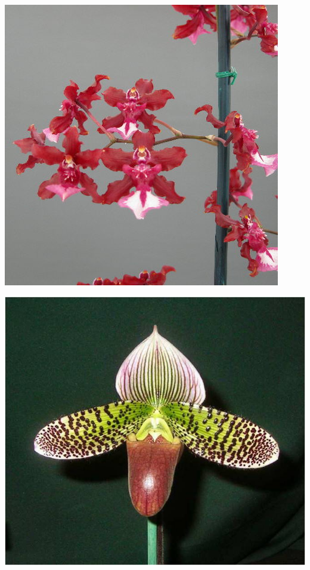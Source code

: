 \documentclass{article}
\begin{document}
\begin{center}
\includegraphics[width=0.9\textheight, angle=90]{../Orchid_Oncidium_Red.jpg}
\end{center}
\newpage

\begin{center}
\includegraphics[width=0.9\textheight, angle=90]{../Orchid_Paphiopedilum_(Lady-Slipper).jpg}
\end{center}
\newpage
\end{document}
